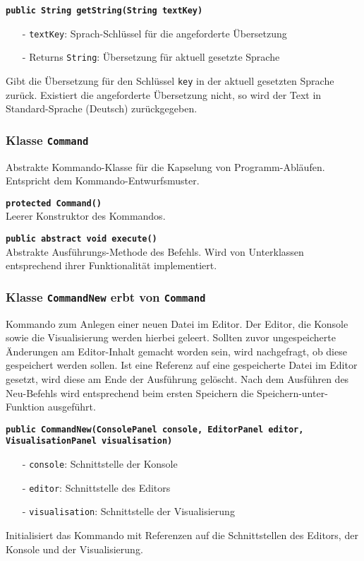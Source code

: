 \documentclass[parskip=full,11pt,twoside]{scrartcl}
\begin{document}
\textbf{\texttt{public String getString(String textKey)}}
\begin{itemize}[noitemsep]
	\item[-] \texttt{textKey}: Sprach-Schlüssel für die angeforderte Übersetzung
	\item[-] Returns \texttt{String}: Übersetzung für aktuell gesetzte Sprache
\end{itemize}
Gibt die Übersetzung für den Schlüssel \texttt{key} in der aktuell gesetzten Sprache zurück. Existiert die angeforderte Übersetzung nicht, so wird der Text in Standard-Sprache (Deutsch) zurückgegeben.

\subsubsection{Klasse \texttt{Command}}

Abstrakte Kommando-Klasse für die Kapselung von Programm-Abläufen. Entspricht dem Kommando-Entwurfsmuster.

\textbf{\texttt{protected Command()}}\\
Leerer Konstruktor des Kommandos.

\textbf{\texttt{public abstract void execute()}}\\
Abstrakte Ausführungs-Methode des Befehls. Wird von Unterklassen entsprechend ihrer Funktionalität implementiert.

\subsubsection{Klasse \texttt{CommandNew} erbt von \texttt{Command}}

Kommando zum Anlegen einer neuen Datei im Editor. Der Editor, die Konsole sowie die Visualisierung werden hierbei geleert. Sollten zuvor ungespeicherte Änderungen am Editor-Inhalt gemacht worden sein, wird nachgefragt, ob diese gespeichert werden sollen. Ist eine Referenz auf eine gespeicherte Datei im Editor gesetzt, wird diese am Ende der Ausführung gelöscht. Nach dem Ausführen des Neu-Befehls wird entsprechend beim ersten Speichern die Speichern-unter-Funktion ausgeführt.

\textbf{\texttt{public CommandNew(ConsolePanel console, EditorPanel editor,\\VisualisationPanel visualisation)}}
\begin{itemize}[noitemsep]
	\item[-] \texttt{console}: Schnittstelle der Konsole
	\item[-] \texttt{editor}: Schnittstelle des Editors
	\item[-] \texttt{visualisation}: Schnittstelle der Visualisierung
\end{itemize}
Initialisiert das Kommando mit Referenzen auf die Schnittstellen des Editors, der Konsole und der Visualisierung.
\end{document}
